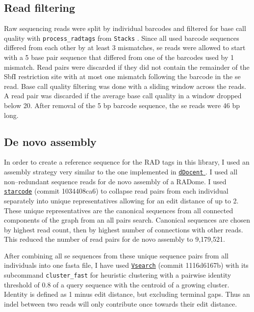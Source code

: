 \documentclass[a4paper,12pt,times,print,index,custombib,custommargin]{PhDThesisPSnPDF}\usepackage[]{graphicx}\usepackage[]{color}
\begin{document}
\subsection{Read filtering}
%
%
Raw sequencing reads were split by individual barcodes and filtered for base call quality with \texttt{process\_radtags} from \texttt{Stacks} \citep{Catchen2011}. Since all used barcode sequences differed from each other by at least 3 mismatches, \gls{se} reads were allowed to start with a 5 base pair sequence that differed from one of the barcodes used by 1 mismatch. Read pairs were discarded if they did not contain the remainder of the SbfI restriction site with at most one mismatch following the barcode in the \gls{se} read. Base call quality filtering was done with a sliding window across the reads. A read pair was discarded if the average base call quality in a window dropped below 20. After removal of the 5 bp barcode sequence, the \gls{se} reads were 46 bp long.
%
%
\subsection{De novo assembly}
%
%
In order to create a reference sequence for the RAD tags in this library, I used an assembly strategy very similar to the one implemented in \href{https://github.com/jpuritz/dDocent}{\texttt{dDocent} }\citep{Puritz2014a}. I used all non--redundant sequence reads for de novo assembly of a RADome. I used \href{https://github.com/gui11aume/starcode}{\texttt{starcode}} (commit 1034408ca6) \citep{Zorita2015} to collapse read pairs from each individual separately into unique representatives allowing for an \gls{edit distance} of up to 2. These unique representatives are the canonical sequences from all \glspl{connected component} of the graph from an \gls{all pairs} search. Canonical sequences are chosen by highest read count, then by highest number of connections with other reads. This reduced the number of read pairs for de novo assembly to 9,179,521.

After combining all \gls{se} sequences from these unique sequence pairs from all individuals into one fasta file, I have used \href{https://github.com/torognes/vsearch}{\texttt{Vsearch}} (commit 1116d6167b) \citep{Rognes2016} with its subcommand \texttt{cluster\_fast} for heuristic clustering with a pairwise identity threshold of 0.8 of a query sequence with the centroid of a growing cluster. Identity is defined as 1 minus \gls{edit distance}, but excluding terminal gaps. Thus an indel between two reads will only contribute once towards their edit distance.
\end{document}
